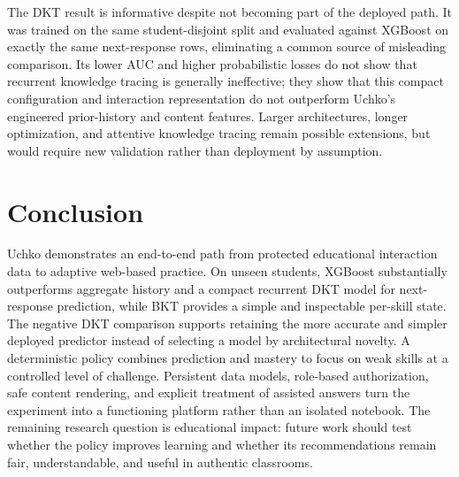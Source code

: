 \documentclass[conference]{IEEEtran}
\newcommand{\ieeeavailable}{1}
\begin{document}
The DKT result is informative despite not becoming part of the deployed path. It was trained on the same student-disjoint split and evaluated against XGBoost on exactly the same next-response rows, eliminating a common source of misleading comparison. Its lower AUC and higher probabilistic losses do not show that recurrent knowledge tracing is generally ineffective; they show that this compact configuration and interaction representation do not outperform Uchko's engineered prior-history and content features. Larger architectures, longer optimization, and attentive knowledge tracing remain possible extensions, but would require new validation rather than deployment by assumption.

\section{Conclusion}
Uchko demonstrates an end-to-end path from protected educational interaction data to adaptive web-based practice. On unseen students, XGBoost substantially outperforms aggregate history and a compact recurrent DKT model for next-response prediction, while BKT provides a simple and inspectable per-skill state. The negative DKT comparison supports retaining the more accurate and simpler deployed predictor instead of selecting a model by architectural novelty. A deterministic policy combines prediction and mastery to focus on weak skills at a controlled level of challenge. Persistent data models, role-based authorization, safe content rendering, and explicit treatment of assisted answers turn the experiment into a functioning platform rather than an isolated notebook. The remaining research question is educational impact: future work should test whether the policy improves learning and whether its recommendations remain fair, understandable, and useful in authentic classrooms.

\ifdefined\ieeeavailable

\else

\fi

\end{document}
